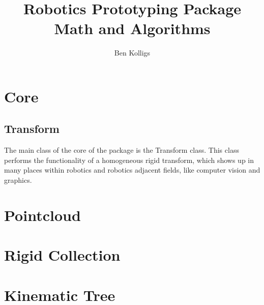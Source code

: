 \documentclass[12pt]{article}
\title{Robotics Prototyping Package Math and Algorithms}
\author{Ben Kolligs}
\date{}
\begin{document}
	\maketitle
	\tableofcontents
	\break
	\section{Core}
	\subsection{Transform}
	The main class of the core of the package is the Transform class. 
	This class performs the functionality of a homogeneous rigid transform, which shows up in many places within robotics and robotics adjacent fields, like computer vision and graphics. 

	
	\section{Pointcloud}
	

	\section{Rigid Collection}
	\label{sec: rigid}
	

	\section{Kinematic Tree}
	\label{sec: kin tree}
	
\end{document}
